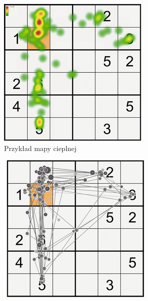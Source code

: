 \begin{figure}[H]
    \centering
    \captionsetup{justification=centering,margin=2cm}
    \begin{subfigure}{.5\textwidth}
      \centering
      \includegraphics[width=\linewidth]{resources/heatmaps.png}
      \caption{Przykład mapy cieplnej}
      \label{fig:heatmap}
    \end{subfigure}%
    \begin{subfigure}{.5\textwidth}
      \centering
      \includegraphics[width=\linewidth]{resources/scanpaths.png}

\end{subfigure}
\end{figure}
